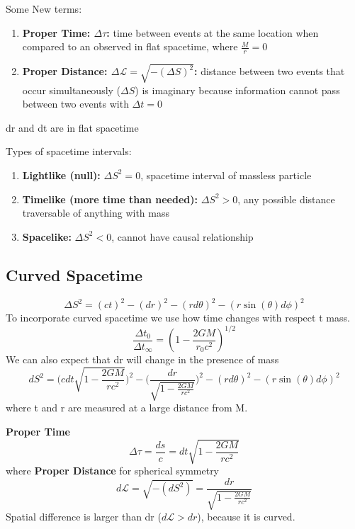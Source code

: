 Some New terms:
\begin{enumerate}
	\item \textbf{Proper Time: $\Delta\tau$: }time between events at the same location when compared to an observed in flat spacetime, where $\frac{M}{r}=0$
	\item \textbf{Proper Distance: $\Delta\mathcal{L}=\sqrt{-(\Delta S)^{2}}$: }distance between two events that occur simultaneously ($\Delta S$) is imaginary because information cannot pass between two events with $\Delta t=0$
\end{enumerate}
dr and dt are in flat spacetime


\hfill
\hfill

Types of spacetime intervals:
\begin{enumerate}	
	\item \textbf{Lightlike (null): } $\Delta S^{2}=0$, spacetime interval of massless particle
	\item \textbf{Timelike (more time than needed): }$\Delta S^{2}>0$, any possible distance traversable of anything with mass
	\item \textbf{Spacelike: }$\Delta S^{2}<0$, cannot have causal relationship 
\end{enumerate}

\subsection{Curved Spacetime}
\begin{equation}
	\label{}
	\Delta S^{2}=(ct)^{2}-(dr)^{2}-(rd\theta)^{2}-(r\sin(\theta)d\phi)^{2}
\end{equation}
To incorporate curved spacetime we use how time changes with respect t mass. 
\begin{equation}
	\label{}
	\frac{\Delta t_{0}}{\Delta t_{\infty}}=(1-\frac{2GM}{r_{0}c^{2}})^{1/2}
\end{equation}
We can also expect that dr will change in the presence of mass
\begin{equation}
	\label{}
	dS^{2}=\bigg(cdt\sqrt{1-\frac{2GM}{rc^{2}}}\bigg)^{2}-\bigg(\frac{dr}{\sqrt{1-\frac{2GM}{rc^{2}}}}\bigg)^{2}-(rd\theta)^{2}-(r\sin(\theta)d\phi)^{2}
\end{equation}
where t and r are measured at a large distance from M.


\textbf{Proper Time}
\begin{equation}
	\label{}
	\Delta\tau=\frac{ds}{c}=dt\sqrt{1-\frac{2GM}{rc^{2}}}
\end{equation}
where
\textbf{Proper Distance} for spherical symmetry
\begin{equation}
	\label{}
	d\mathcal{L}=\sqrt{-(dS^{2})}=\frac{dr}{\sqrt{1-\frac{2GM}{rc^{2}}}}
\end{equation}
Spatial difference is larger than dr ($d\mathcal{L}>dr$), because it is curved.


